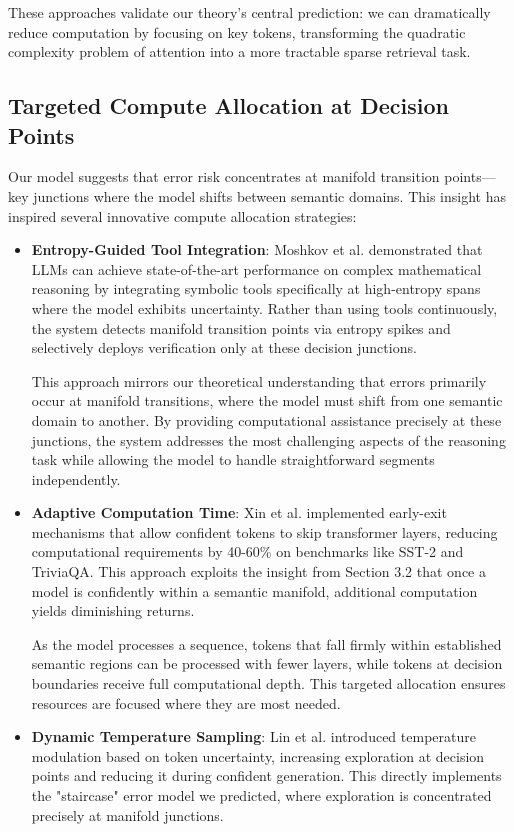 \documentclass{article}
\begin{document}
These approaches validate our theory's central prediction: we can dramatically reduce computation by focusing on key tokens, transforming the quadratic complexity problem of attention into a more tractable sparse retrieval task.

\subsection{Targeted Compute Allocation at Decision Points}

Our model suggests that error risk concentrates at manifold transition points—key junctions where the model shifts between semantic domains. This insight has inspired several innovative compute allocation strategies:

\begin{itemize}
\item \textbf{Entropy-Guided Tool Integration}: Moshkov et al. \citep{moshkov2025aimo} demonstrated that LLMs can achieve state-of-the-art performance on complex mathematical reasoning by integrating symbolic tools specifically at high-entropy spans where the model exhibits uncertainty. Rather than using tools continuously, the system detects manifold transition points via entropy spikes and selectively deploys verification only at these decision junctions.

  This approach mirrors our theoretical understanding that errors primarily occur at manifold transitions, where the model must shift from one semantic domain to another. By providing computational assistance precisely at these junctions, the system addresses the most challenging aspects of the reasoning task while allowing the model to handle straightforward segments independently.

\item \textbf{Adaptive Computation Time}: Xin et al. \citep{xin2023adaptive} implemented early-exit mechanisms that allow confident tokens to skip transformer layers, reducing computational requirements by 40-60\% on benchmarks like SST-2 and TriviaQA. This approach exploits the insight from Section 3.2 that once a model is confidently within a semantic manifold, additional computation yields diminishing returns.

  As the model processes a sequence, tokens that fall firmly within established semantic regions can be processed with fewer layers, while tokens at decision boundaries receive full computational depth. This targeted allocation ensures resources are focused where they are most needed.

\item \textbf{Dynamic Temperature Sampling}: Lin et al. \citep{lin2024dynamic} introduced temperature modulation based on token uncertainty, increasing exploration at decision points and reducing it during confident generation. This directly implements the "staircase" error model we predicted, where exploration is concentrated precisely at manifold junctions.
\end{itemize}
\end{document}
